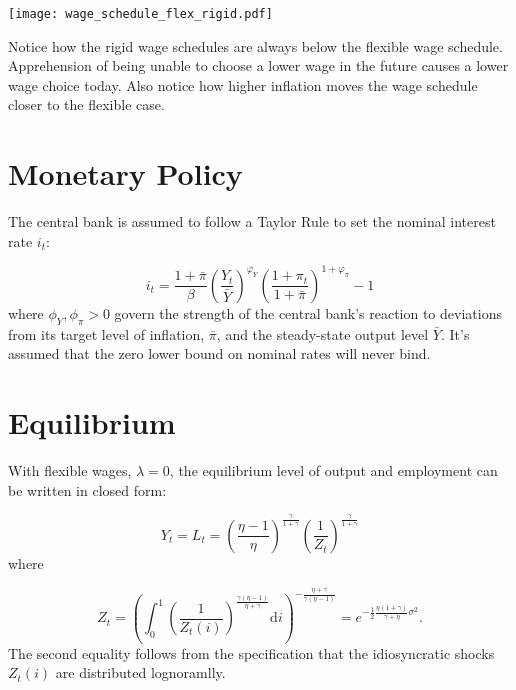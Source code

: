 \documentclass[12pt,a4paper]{scrartcl}            %
\begin{document}
\begin{center}
  \noindent \texttt{[image: wage\_schedule\_flex\_rigid.pdf]}
  \label{fig:wage_schedules}
\end{center}
%
Notice how the rigid wage schedules are always below the flexible wage schedule.
Apprehension of being unable to choose a lower wage in the future causes a lower wage choice today.
Also notice how higher inflation moves the wage schedule closer to the flexible case.


\section{Monetary Policy}
\label{sec:monetary_policy}

The central bank is assumed to follow a Taylor Rule to set the nominal interest rate $i_t$:

\begin{equation}
    \label{eq:taylor_rule}
    i_t = \frac{1 + \bar{\pi}}{\beta} \left( \frac{Y_t}{\bar{Y}} \right)^{\varphi_Y} \left( \frac{1 + \pi_t}{1 + \bar{\pi}} \right)^{1 + \varphi_{\pi}} - 1
\end{equation}
%
where $\phi_Y, \phi_{\pi} > 0$ govern the strength of the central bank's reaction to deviations from its target level of inflation, $\bar{\pi}$, and the steady-state output level $\bar{Y}$.
It's assumed that the zero lower bound on nominal rates will never bind.

\section{Equilibrium}
\label{sec:equilibrium}

With flexible wages, $\lambda = 0$, the equilibrium level of output and employment can be written in closed form:

\begin{equation}
    \label{eq:output_flexible}
    Y_t = L_t = \left( \frac{\eta - 1}{\eta} \right)^{\frac{\gamma}{1 + \gamma}} \left( \frac{1}{Z_t} \right)^{\frac{\gamma}{1 + \gamma}}
\end{equation}
%
where

\begin{equation}
    Z_t = \left( \int_{0}^{1}\! \left( \frac{1}{Z_t(i)} \right)^{\frac{\gamma(\eta - 1)}{\eta + \gamma}} \mathrm{d}i \right)^{-\frac{\eta + \gamma}{\gamma(\eta - 1)}} \!\!\! = e^{-\frac{1}{2} \frac{\eta(1 + \gamma)}{\gamma + \eta}\sigma^2 }.
\end{equation}
%
The second equality follows from the specification that the idiosyncratic shocks $Z_t(i)$ are distributed lognoramlly.
\end{document}
